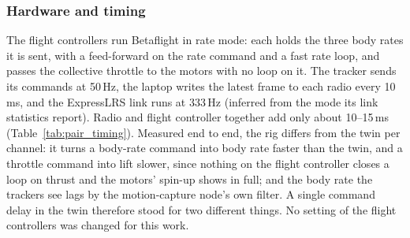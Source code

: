 \subsubsection{Hardware and timing}

The flight controllers run Betaflight in rate mode: each holds the three body rates it is sent, with a feed-forward on
the rate command and a fast rate loop, and passes the collective throttle to the motors with no loop on it. The tracker
sends its commands at 50\,Hz, the laptop writes the latest frame to each radio every 10\,ms, and the ExpressLRS link
runs at 333\,Hz (inferred from the mode its link statistics report). Radio and flight controller together add only about 10--15\,ms
(Table~\ref{tab:pair_timing}). Measured end to end, the rig differs from the twin per channel: it turns a body-rate
command into body rate faster than the twin, and a throttle command into lift slower, since nothing on the flight
controller closes a loop on thrust and the motors' spin-up shows in full; and the body rate the trackers see lags by
the motion-capture node's own filter. A single command delay in the twin therefore stood for two different things.
No setting of the flight controllers was changed for this work.

